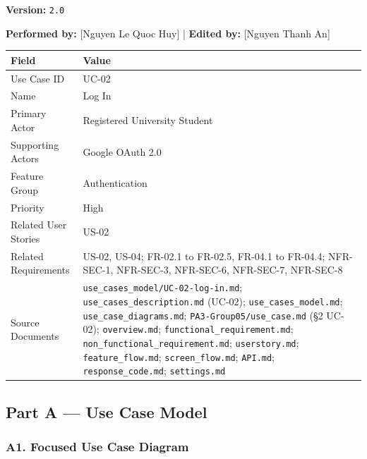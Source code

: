 \documentclass[12pt]{article}
\renewcommand{\baselinestretch}{1.5}
\begin{document}
\textbf{Version:} \texttt{2.0}
\par\medskip

\textbf{Performed by:} [Nguyen Le Quoc Huy] | \textbf{Edited by:} [Nguyen Thanh An]
\par\medskip

\begingroup
\small
\renewcommand{\baselinestretch}{1.0}\selectfont
\renewcommand{\arraystretch}{1.15}
\setlength{\tabcolsep}{6pt}
\begin{longtable}{|>{\raggedright\arraybackslash}p{}|>{\raggedright\arraybackslash}p{}|}
\hline
\textbf{Field} & \textbf{Value} \\ \hline
\endhead
Use Case ID & UC-02 \\ \hline
Name & Log In \\ \hline
Primary Actor & Registered University Student \\ \hline
Supporting Actors & Google OAuth 2.0 \\ \hline
Feature Group & Authentication \\ \hline
Priority & High \\ \hline
Related User Stories & US-02 \\ \hline
Related Requirements & US-02, US-04; FR-02.1 to FR-02.5, FR-04.1 to FR-04.4; NFR-SEC-1, NFR-SEC-3, NFR-SEC-6, NFR-SEC-7, NFR-SEC-8 \\ \hline
Source Documents & \texttt{use\_cases\_model/UC-02-log-in.md}; \texttt{use\_cases\_description.md} (UC-02); \texttt{use\_cases\_model.md}; \texttt{use\_case\_diagrams.md}; \texttt{PA3-Group05/use\_case.md} (§2 UC-02); \texttt{overview.md}; \texttt{functional\_requirement.md}; \texttt{non\_functional\_requirement.md}; \texttt{userstory.md}; \texttt{feature\_flow.md}; \texttt{screen\_flow.md}; \texttt{API.md}; \texttt{response\_code.md}; \texttt{settings.md} \\ \hline
\end{longtable}
\endgroup
\par\medskip

\hypertarget{sec:part-a-use-case-model}{}
\subsection*{Part A --- Use Case Model}
\par\medskip

\hypertarget{sec:a1-focused-use-case-diagram}{}
\subsubsection*{A1. Focused Use Case Diagram}
\par\medskip
\end{document}
